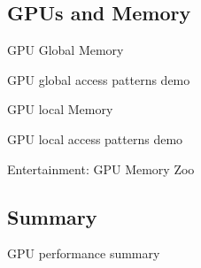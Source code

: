 \documentclass[english,compress]{beamer}
\begin{document}
\subsection{GPUs and Memory}


\begin{frame}{GPU Global Memory}
  \begin{center}
  \Huge GPU global access patterns demo
  \end{center}
\end{frame}

\begin{frame}{GPU local Memory}
  \begin{center}
  \Huge GPU local access patterns demo
  \end{center}
\end{frame}
\begin{frame}{Entertainment: GPU Memory Zoo}


\end{frame}
\subsection{Summary}
\begin{frame}{GPU performance summary}
\end{frame}



% 
% 


\questionframe{}
\end{document}
